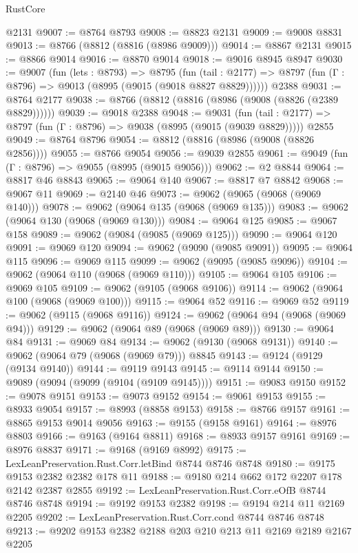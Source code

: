 \begin{lexlean}{RustCore}
\begin{coremodule}
    @2131
@9007 := @8764 @8793
@9008 := @8823 @2131
@9009 := @9008 @8831
@9013 := @8766 (@8812 (@8816 (@8986 @9009)))
@9014 := @8867 @2131
@9015 := @8866 @9014
@9016 := @8870 @9014
@9018 := @9016 @8945 @8947
@9030 := @9007
    (fun (lets : @8793) =>
    @8795
      (fun (tail : @2177) => @8797 (fun (Γ : @8796) => @9013 (@8995 (@9015 (@9018 @8827 @8829))))))
    @2388
@9031 := @8764 @2177
@9038 := @8766 (@8812 (@8816 (@8986 (@9008 (@8826 (@2389 @8829))))))
@9039 := @9018 @2388
@9048 := @9031
    (fun (tail : @2177) => @8797 (fun (Γ : @8796) => @9038 (@8995 (@9015 (@9039 @8829)))))
    @2855
@9049 := @8764 @8796
@9054 := @8812 (@8816 (@8986 (@9008 (@8826 @2856))))
@9055 := @8766 @9054
@9056 := @9039 @2855
@9061 := @9049 (fun (Γ : @8796) => @9055 (@8995 (@9015 @9056)))
@9062 := @2 @8844
@9064 := @8817 @46 @8843
@9065 := @9064 @140
@9067 := @8817 @7 @8842
@9068 := @9067 @11
@9069 := @2140 @46
@9073 := @9062 (@9065 (@9068 (@9069 @140)))
@9078 := @9062 (@9064 @135 (@9068 (@9069 @135)))
@9083 := @9062 (@9064 @130 (@9068 (@9069 @130)))
@9084 := @9064 @125
@9085 := @9067 @158
@9089 := @9062 (@9084 (@9085 (@9069 @125)))
@9090 := @9064 @120
@9091 := @9069 @120
@9094 := @9062 (@9090 (@9085 @9091))
@9095 := @9064 @115
@9096 := @9069 @115
@9099 := @9062 (@9095 (@9085 @9096))
@9104 := @9062 (@9064 @110 (@9068 (@9069 @110)))
@9105 := @9064 @105
@9106 := @9069 @105
@9109 := @9062 (@9105 (@9068 @9106))
@9114 := @9062 (@9064 @100 (@9068 (@9069 @100)))
@9115 := @9064 @52
@9116 := @9069 @52
@9119 := @9062 (@9115 (@9068 @9116))
@9124 := @9062 (@9064 @94 (@9068 (@9069 @94)))
@9129 := @9062 (@9064 @89 (@9068 (@9069 @89)))
@9130 := @9064 @84
@9131 := @9069 @84
@9134 := @9062 (@9130 (@9068 @9131))
@9140 := @9062 (@9064 @79 (@9068 (@9069 @79))) @8845
@9143 := @9124 (@9129 (@9134 @9140))
@9144 := @9119 @9143
@9145 := @9114 @9144
@9150 := @9089 (@9094 (@9099 (@9104 (@9109 @9145))))
@9151 := @9083 @9150
@9152 := @9078 @9151
@9153 := @9073 @9152
@9154 := @9061 @9153
@9155 := @8933 @9054
@9157 := @8993 (@8858 @9153)
@9158 := @8766 @9157
@9161 := @8865 @9153 @9014 @9056
@9163 := @9155 (@9158 @9161)
@9164 := @8976 @8803
@9166 := @9163 (@9164 @8811)
@9168 := @8933 @9157 @9161
@9169 := @8976 @8837
@9171 := @9168 (@9169 @8992)
@9175 := LexLeanPreservation.Rust.Corr.letBind @8744 @8746 @8748
@9180 := @9175 @9153 @2382 @2382 @178 @11
@9188 := @9180 @214 @662 @172 @2207 @178 @2142 @2387 @2855
@9192 := LexLeanPreservation.Rust.Corr.eOfB @8744 @8746 @8748
@9194 := @9192 @9153 @2382
@9198 := @9194 @214 @11 @2169 @2205
@9202 := LexLeanPreservation.Rust.Corr.cond @8744 @8746 @8748
@9213 := @9202 @9153 @2382 @2188 @203 @210 @213 @11 @2169 @2189 @2167 @2205

\end{coremodule}
\end{lexlean}
